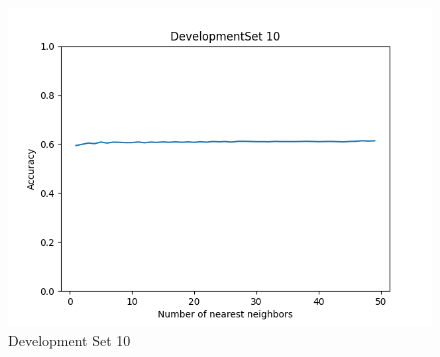 \documentclass{article}
\begin{document}
\begin{figure}[H]
\begin{minipage}{.33\textwidth}
			\includegraphics[width=1\linewidth]{../KNN_DevelopmentSet 10.png}
			\caption{Development Set 10}
	\end{minipage}\hfill
\end{figure}
\end{document}
